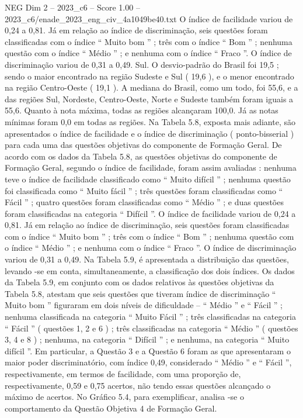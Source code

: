 \begin{textsample}{NEG Dim 2 – 2023\_c6 – Score 1.00 – 2023\_c6/enade\_2023\_eng\_civ\_4a1049be40.txt}
O índice de facilidade variou de 0,24 a 0,81.
Já em relação ao índice de discriminação, seis questões foram classificadas com o índice “ Muito bom ” ; três com o índice “ Bom ” ; nenhuma questão com o índice “ Médio ” ; e nenhuma com o índice “ Fraco ”.
O índice de discriminação variou de 0,31 a 0,49.
Sul.
O desvio-padrão do Brasil foi 19,5 ; sendo o maior encontrado na região Sudeste e Sul ( 19,6 ), e o menor encontrado na região Centro-Oeste ( 19,1 ).
A mediana do Brasil, como um todo, foi 55,6, e a das regiões Sul, Nordeste, Centro-Oeste, Norte e Sudeste também foram iguais a 55,6.
Quanto à nota máxima, todas as regiões alcançaram 100,0.
Já as notas mínimas foram 0,0 em todas as regiões.
Na Tabela 5.8, exposta mais adiante, são apresentados o índice de facilidade e o índice de discriminação ( ponto-bisserial ) para cada uma das questões objetivas do componente de Formação Geral.
De acordo com os dados da Tabela 5.8, as questões objetivas do componente de Formação Geral, segundo o índice de facilidade, foram assim avaliadas : nenhuma teve o índice de facilidade classificado como “ Muito difícil ” ; nenhuma questão foi classificada como “ Muito fácil ” ; três questões foram classificadas como “ Fácil ” ; quatro questões foram classificadas como “ Médio ” ; e duas questões foram classificadas na categoria “ Difícil ”.
O índice de facilidade variou de 0,24 a 0,81.
Já em relação ao índice de discriminação, seis questões foram classificadas com o índice “ Muito bom ” ; três com o índice “ Bom ” ; nenhuma questão com o índice “ Médio ” ; e nenhuma com o índice “ Fraco ”.
O índice de discriminação variou de 0,31 a 0,49.
Na Tabela 5.9, é apresentada a distribuição das questões, levando -se em conta, simultaneamente, a classificação dos dois índices.
Os dados da Tabela 5.9, em conjunto com os dados relativos às questões objetivas da Tabela 5.8, atestam que seis questões que tiveram índice de discriminação “ Muito bom ” figuraram em dois níveis de dificuldade – “ Médio ” e “ Fácil ” ; nenhuma classificada na categoria “ Muito Fácil ” ; três classificadas na categoria “ Fácil ” ( questões 1, 2 e 6 ) ; três classificadas na categoria “ Médio ” ( questões 3, 4 e 8 ) ; nenhuma, na categoria “ Difícil ” ; e nenhuma, na categoria “ Muito difícil ”.
Em particular, a Questão 3 e a Questão 6 foram as que apresentaram o maior poder discriminatório, com índice 0,49, considerado “ Médio ” e “ Fácil ”, respectivamente, em termos de facilidade, com uma proporção de, respectivamente, 0,59 e 0,75 acertos, não tendo essas questões alcançado o máximo de acertos.
No Gráfico 5.4, para exemplificar, analisa -se o comportamento da Questão Objetiva 4 de Formação Geral.

\end{textsample}
